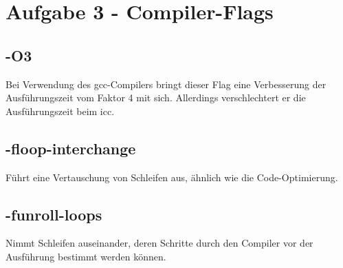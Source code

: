\section{Aufgabe 3 - Compiler-Flags}

\subsection{-O3}
Bei Verwendung des gcc-Compilers bringt dieser Flag eine Verbesserung der Ausführungszeit vom Faktor 4 mit sich. Allerdings verschlechtert er die Ausführungszeit beim icc.
\subsection{-floop-interchange}
Führt eine Vertauschung von Schleifen aus, ähnlich wie die Code-Optimierung.
\subsection{-funroll-loops}
Nimmt Schleifen auseinander, deren Schritte durch den Compiler vor der Ausführung bestimmt werden können.


